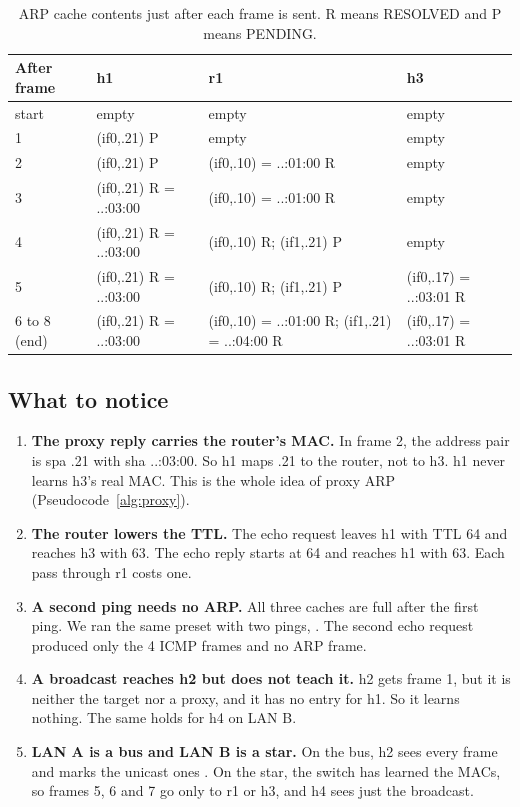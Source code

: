 \begin{table}[htbp]
\centering
\caption{ARP cache contents just after each frame is sent. R means RESOLVED and P means PENDING.}
\label{tab:e-cache}
\footnotesize
\begin{tabularx}{\linewidth}{@{}l Y Y Y@{}}
\toprule
After frame & h1 & r1 & h3 \\
\midrule
start & empty & empty & empty \\
1 & (if0,.21) P & empty & empty \\
2 & (if0,.21) P & (if0,.10) = ..:01:00 R & empty \\
3 & (if0,.21) R = ..:03:00 & (if0,.10) = ..:01:00 R & empty \\
4 & (if0,.21) R = ..:03:00 & (if0,.10) R; (if1,.21) P & empty \\
5 & (if0,.21) R = ..:03:00 & (if0,.10) R; (if1,.21) P & (if0,.17) = ..:03:01 R \\
6 to 8 (end) & (if0,.21) R = ..:03:00 & (if0,.10) = ..:01:00 R; (if1,.21) = ..:04:00 R & (if0,.17) = ..:03:01 R \\
\bottomrule
\end{tabularx}
\end{table}

\subsection{What to notice}
\begin{enumerate}[leftmargin=1.6em, itemsep=2pt]
\item \textbf{The proxy reply carries the router's MAC.} In frame 2, the address pair is spa .21 with sha ..:03:00. So h1 maps .21 to the router, not to h3. h1 never learns h3's real MAC. This is the whole idea of proxy ARP (Pseudocode~\ref{alg:proxy}).
\item \textbf{The router lowers the TTL.} The echo request leaves h1 with TTL 64 and reaches h3 with 63. The echo reply starts at 64 and reaches h1 with 63. Each pass through r1 costs one.
\item \textbf{A second ping needs no ARP.} All three caches are full after the first ping. We ran the same preset with two pings, . The second echo request produced only the 4 ICMP frames and no ARP frame.
\item \textbf{A broadcast reaches h2 but does not teach it.} h2 gets frame 1, but it is neither the target nor a proxy, and it has no entry for h1. So it learns nothing. The same holds for h4 on LAN B.
\item \textbf{LAN A is a bus and LAN B is a star.} On the bus, h2 sees every frame and marks the unicast ones . On the star, the switch has learned the MACs, so frames 5, 6 and 7 go only to r1 or h3, and h4 sees just the broadcast.
\end{enumerate}
